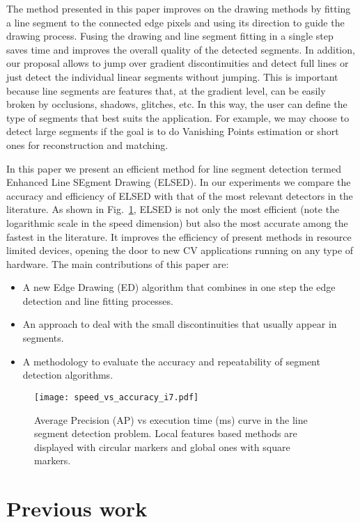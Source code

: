\documentclass[preprint,12pt]{elsarticle}
\begin{document}
The method presented in this paper improves on the drawing methods by fitting a line segment to the connected edge pixels and using its direction to guide the drawing process. Fusing the drawing and line segment fitting in a single step saves time and improves the overall quality of the detected segments.
In addition, our proposal allows to jump over gradient discontinuities and detect full lines or just detect the individual linear segments without jumping.
This is important because line segments are features that, at the gradient level, can be easily broken by occlusions, shadows, glitches, etc.
In this way, the user can define the type of segments that best suits the application. For example, we may choose to detect large segments if the goal is to do Vanishing Points estimation or short ones for reconstruction and matching. 

In this paper we present an efficient method for line segment detection termed Enhanced Line SEgment Drawing (ELSED). In our experiments we compare the accuracy and efficiency of ELSED with that of the most relevant detectors in the literature. As shown in Fig.~\ref{fig:sample_of_line_segments}, ELSED is not only the most efficient (note the logarithmic scale in the speed dimension) but also the most accurate among the fastest in the literature.
It improves the efficiency of present methods in resource limited devices, opening the door to new CV applications running on any type of hardware. The main contributions of this paper are:
\begin{itemize}
 \item A new Edge Drawing (ED) algorithm that combines in one step the edge detection and line fitting processes.
 \item An approach to deal with the small discontinuities that usually appear in segments.
 \item A methodology to evaluate the accuracy and repeatability of segment detection algorithms.
\end{itemize}

\begin{figure}
    \centering
    \texttt{[image: speed\_vs\_accuracy\_i7.pdf]}
    \caption{Average Precision (AP) vs execution time (ms) curve in the line segment detection problem. Local features based methods are displayed with circular markers and global ones with square markers.} 
    \label{fig:sample_of_line_segments}
\end{figure}


\section{Previous work}
\label{sec:state_of_art}
\end{document}
